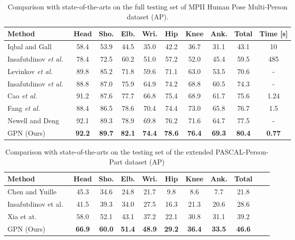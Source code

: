 \documentclass[10pt,twocolumn,letterpaper]{article}
\begin{document}
\begin{table}[t!]\scriptsize \caption{Comparison with state-of-the-arts on the full testing set of MPII Human Pose Multi-Person dataset (AP).}
  \label{tab:exp_mpii_sota}
  \centering
  \setlength{\tabcolsep}{2pt}
  \begin{tabular}{lccccccccc}
    \toprule
    Method   &Head & Sho. & Elb. & Wri. & Hip & Knee  & Ank. & Total & Time [s]\\
    \midrule
    Iqbal and Gall~\cite{iqbal2016multi} & 58.4  & 53.9  & 44.5  & 35.0  & 42.2  & 36.7 & 31.1 & 43.1 & 10\\
    Insafutdinov \emph{et al.}~\cite{hpe:deepercut_eccv16} & 78.4  & 72.5  & 60.2  & 51.0  & 57.2  & 52.0 & 45.4 & 59.5 & 485\\
    Levinkov \emph{et al.}~\cite{levinkov2017joint} & 89.8 & 85.2 &	71.8 &	59.6 &	71.1 &	63.0 &	53.5 &	70.6 & - \\
    Insafutdinov \emph{et al.}~\cite{insafutdinov2016articulated} & 88.8  & 87.0  & 75.9  & 64.9  & 74.2  & 68.8 & 60.5 & 74.3 & - \\
    Cao \emph{et al.}~\cite{cao2017realtime} & 91.2  & 87.6  & 77.7  & 66.8  & 75.4  & 68.9 & 61.7 & 75.6 & 1.24\\
    Fang \emph{et al.}~\cite{fang16rmpe}& 88.4  & 86.5  & 78.6  & 70.4  & 74.4  & 73.0 & 65.8 & 76.7 & 1.5\\
    Newell and Deng~\cite{newell2016associative} & 92.1 & 89.3 & 78.9 & 69.8 & 76.2 & 71.6 & 64.7 & 77.5 & - \\
    \midrule
    GPN (Ours) & \textbf{92.2}  & \textbf{89.7}  & \textbf{82.1}  & \textbf{74.4}  & \textbf{78.6}  & \textbf{76.4} & \textbf{69.3} & \textbf{80.4} & \textbf{0.77} \\
    \bottomrule
  \end{tabular}
\end{table}

\begin{table}[t!]\footnotesize
    \caption{Comparison with state-of-the-arts on the testing set of the extended PASCAL-Person-Part dataset (AP)}
    \label{tab:exp_pascal_sota}
    \centering
    \setlength{\tabcolsep}{2pt}
    \begin{tabular}{lcccccccccc}
        \toprule
        Method &Head & Sho. & Elb. & Wri. & Hip & Knee  & Ank. & Total\\
        \midrule
        Chen and Yuille~\cite{chen2015parsing} & 45.3 & 34.6 & 24.8 & 21.7 & 9.8 & 8.6 & 7.7 &  21.8\\
        Insafutdinov et al.~\cite{hpe:deepercut_eccv16} & 41.5 & 39.3 & 34.0 & 27.5 & 16.3 & 21.3 & 20.6 &  28.6\\
        Xia et at.~\cite{xia2017joint} & 58.0 & 52.1 & 43.1 & 37.2 & 22.1 & 30.8 & 31.1 & 39.2\\
        \midrule
        GPN (Ours) & \textbf{66.9} & \textbf{60.0} & \textbf{51.4} & \textbf{48.9} & \textbf{29.2} & \textbf{36.4} & \textbf{33.5}  & \textbf{46.6} \\
        \bottomrule
    \end{tabular}
\end{table}
\end{document}
